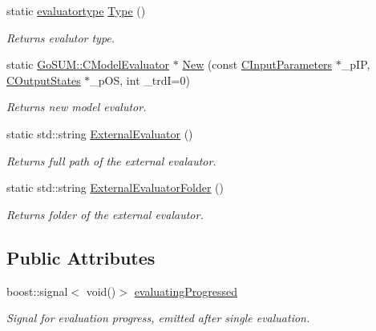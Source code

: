 \begin{DoxyCompactItemize}
static \hyperlink{class_go_s_u_m_1_1_c_evaluator_a50058cbf6a2c5b94677045ee02b67db2}{evaluatortype} \hyperlink{class_go_s_u_m_1_1_c_evaluator_a134a607068d97d9fba70442e53e19516}{Type} ()
\begin{DoxyCompactList}\small\item\em Returns evalutor type. \end{DoxyCompactList}\item 
static \hyperlink{class_go_s_u_m_1_1_c_model_evaluator}{Go\-S\-U\-M\-::\-C\-Model\-Evaluator} $\ast$ \hyperlink{class_go_s_u_m_1_1_c_evaluator_a326cfc86daad6593f5f4b481f4b2a374}{New} (const \hyperlink{class_go_s_u_m_1_1_c_input_parameters}{C\-Input\-Parameters} $\ast$\-\_\-p\-I\-P, \hyperlink{class_go_s_u_m_1_1_c_output_states}{C\-Output\-States} $\ast$\-\_\-p\-O\-S, int \-\_\-trd\-I=0)
\begin{DoxyCompactList}\small\item\em Returns new model evalutor. \end{DoxyCompactList}\item 
static std\-::string \hyperlink{class_go_s_u_m_1_1_c_evaluator_a9c16bc0381ea164e080dcf379e08bcbc}{External\-Evaluator} ()
\begin{DoxyCompactList}\small\item\em Returns full path of the external evalautor. \end{DoxyCompactList}\item 
static std\-::string \hyperlink{class_go_s_u_m_1_1_c_evaluator_a2f968952d01303754d69977cd11252ab}{External\-Evaluator\-Folder} ()
\begin{DoxyCompactList}\small\item\em Returns folder of the external evalautor. \end{DoxyCompactList}\end{DoxyCompactItemize}
\subsection*{Public Attributes}
\begin{DoxyCompactItemize}
\item 
boost\-::signal$<$ void()$>$ \hyperlink{class_go_s_u_m_1_1_c_evaluator_ad7c33e830a5ebddbe7a0ddf873b615fe}{evaluating\-Progressed}
\begin{DoxyCompactList}\small\item\em Signal for evaluation progress, emitted after single evaluation. \end{DoxyCompactList}\end{DoxyCompactItemize}

